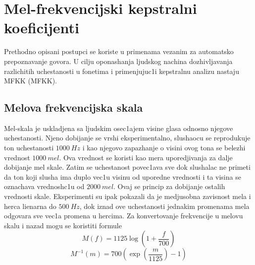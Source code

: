 \documentclass[a4paper, openany, oneside, 11pt]{book}
\begin{document}
\section{Mel-frekvencijski kepstralni koeficijenti}
Prethodno opisani postupci se koriste u primenama vezanim za automat\-sko prepoznavanje govora. U cilju oponashanja ljudskog nachina dozhivljavanja razlichitih uchestanosti u fonetima i primenjujuc1i kepstralnu analizu nastaju \acrlong{MFKK} (\acrshort{MFKK}). 
\subsection{Melova frekvencijska skala}
Mel-skala je uskladjena sa ljudskim osec1ajem visine glasa odnosno njegove uchestanosti. Njeno dobijanje se vrshi eksperimentalno, slushaocu se reprodukuje ton uchestanosti $\SI{1000}{Hz}$ i kao njegovo zapazhanje o visini ovog tona se belezhi vrednost $\SI{1000}{mel}$. Ova vrednost se koristi kao mera uporedjivanja za dalje dobijanje mel skale. Zatim se uchestanost povec1ava sve dok slushalac ne primeti da ton koji slusha ima duplo vec1u visinu od uporedne vrednosti i ta visina se oznachava vrednosh\-c1u od $\SI{2000}{mel}$. Ovaj se princip za dobijanje ostalih vrednosti skale. Eksperimenti su ipak pokazali da je medjusobna zavisnost mela i herca lienarna do $\SI{500}{Hz}$, dok iznad ove uchestanosti jednakim promenama mela odgovara sve vec1a promena u hercima. Za konvertovanje frekvencije u melovu skalu i nazad mogu se koristiti formule
\begin{equation}\label{freq2mel}
M(f) = 1125\log\left(1+\frac{f}{700}\right)
\end{equation}
\begin{equation}\label{mel2freq}
M^{-1}(m) = 700\left(\exp\left(\frac{m}{1125}\right)-1\right)
\end{equation}
\end{document}
